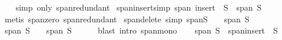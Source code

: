 \begin{isabellebody}
%
\isadelimproof
\ \ %
\endisadelimproof
%
\isatagproof
{}\isamarkupfalse%
\ {\isacharparenleft}{\kern0pt}simp\ only{\isacharcolon}{\kern0pt}\ span{\isacharunderscore}{\kern0pt}redundant{\isacharparenright}{\kern0pt}%
\endisatagproof
{\isafoldproof}%
%
\isadelimproof
\isanewline
%
\endisadelimproof
\isanewline
{}\isamarkupfalse%
\ span{\isacharunderscore}{\kern0pt}insert{\isacharunderscore}{\kern0pt}{}{\isacharbrackleft}{\kern0pt}simp{\isacharbrackright}{\kern0pt}{\isacharcolon}{\kern0pt}\ {\isachardoublequoteopen}span\ {\isacharparenleft}{\kern0pt}insert\ {}\ S{\isacharparenright}{\kern0pt}\ {\isacharequal}{\kern0pt}\ span\ S{\isachardoublequoteclose}\isanewline
%
\isadelimproof
\ \ %
\endisadelimproof
%
\isatagproof
{}\isamarkupfalse%
\ {\isacharparenleft}{\kern0pt}metis\ span{\isacharunderscore}{\kern0pt}zero\ span{\isacharunderscore}{\kern0pt}redundant{\isacharparenright}{\kern0pt}%
\endisatagproof
{\isafoldproof}%
%
\isadelimproof
\isanewline
%
\endisadelimproof
\isanewline
{}\isamarkupfalse%
\ span{\isacharunderscore}{\kern0pt}delete{\isacharunderscore}{\kern0pt}{}\ {\isacharbrackleft}{\kern0pt}simp{\isacharbrackright}{\kern0pt}{\isacharcolon}{\kern0pt}\ {\isachardoublequoteopen}span{\isacharparenleft}{\kern0pt}S\ {\isacharminus}{\kern0pt}\ {\isacharbraceleft}{\kern0pt}{}{\isacharbraceright}{\kern0pt}{\isacharparenright}{\kern0pt}\ {\isacharequal}{\kern0pt}\ span\ S{\isachardoublequoteclose}\isanewline
%
\isadelimproof
%
\endisadelimproof
%
\isatagproof
{}\isamarkupfalse%
\isanewline
\ \ \isamarkupfalse%
\ {\isachardoublequoteopen}span\ {\isacharparenleft}{\kern0pt}S\ {\isacharminus}{\kern0pt}\ {\isacharbraceleft}{\kern0pt}{}{\isacharbraceright}{\kern0pt}{\isacharparenright}{\kern0pt}\ {\isasymsubseteq}\ span\ S{\isachardoublequoteclose}\isanewline
\ \ \ \ \isamarkupfalse%
\ {\isacharparenleft}{\kern0pt}blast\ intro{\isacharbang}{\kern0pt}{\isacharcolon}{\kern0pt}\ span{\isacharunderscore}{\kern0pt}mono{\isacharparenright}{\kern0pt}\isanewline
{}\isamarkupfalse%
\isanewline
\ \ \isamarkupfalse%
\ {\isachardoublequoteopen}span\ S\ {\isasymsubseteq}\ span{\isacharparenleft}{\kern0pt}insert\ {}\ {\isacharparenleft}{\kern0pt}S\ {\isacharminus}{\kern0pt}\ {\isacharbraceleft}{\kern0pt}{}{\isacharbraceright}{\kern0pt}{\isacharparenright}{\kern0pt}{\isacharparenright}{\kern0pt}{\isachardoublequoteclose}\isanewline
\ \ \ \ \isamarkupfalse%

\end{isabellebody}
